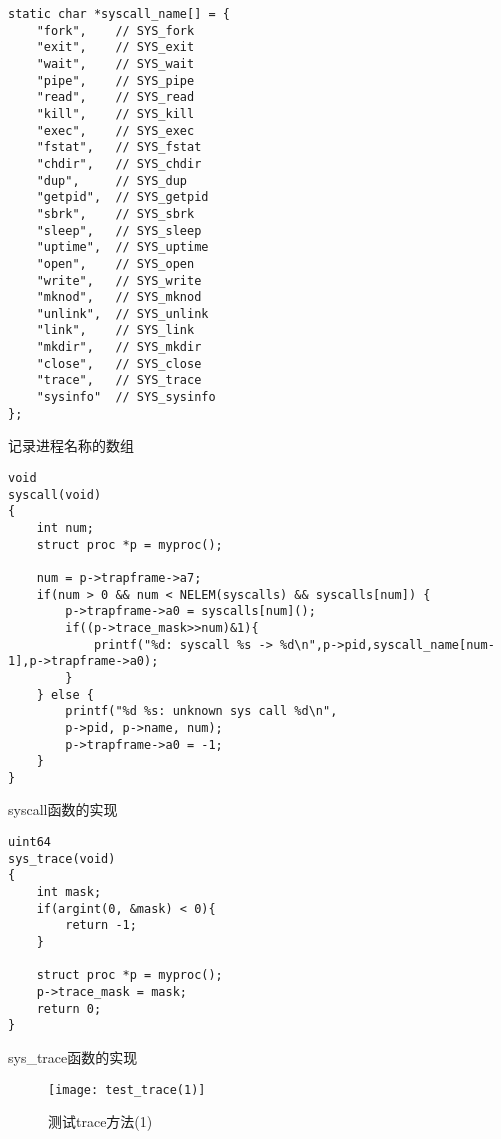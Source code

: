 \begin{listing}[!htb]
	\begin{verbatim}
static char *syscall_name[] = {
    "fork",    // SYS_fork
    "exit",    // SYS_exit
    "wait",    // SYS_wait
    "pipe",    // SYS_pipe
    "read",    // SYS_read
    "kill",    // SYS_kill
    "exec",    // SYS_exec
    "fstat",   // SYS_fstat
    "chdir",   // SYS_chdir
    "dup",     // SYS_dup
    "getpid",  // SYS_getpid
    "sbrk",    // SYS_sbrk
    "sleep",   // SYS_sleep
    "uptime",  // SYS_uptime
    "open",    // SYS_open
    "write",   // SYS_write
    "mknod",   // SYS_mknod
    "unlink",  // SYS_unlink
    "link",    // SYS_link
    "mkdir",   // SYS_mkdir
    "close",   // SYS_close
    "trace",   // SYS_trace
    "sysinfo"  // SYS_sysinfo
};
	\end{verbatim}
	\caption{记录进程名称的数组}\label{lst:syscall_name}
\end{listing}

\begin{listing}[!htb]
	\begin{verbatim}
void
syscall(void)
{
    int num;
    struct proc *p = myproc();
    
    num = p->trapframe->a7;
    if(num > 0 && num < NELEM(syscalls) && syscalls[num]) {
        p->trapframe->a0 = syscalls[num]();
        if((p->trace_mask>>num)&1){
            printf("%d: syscall %s -> %d\n",p->pid,syscall_name[num-1],p->trapframe->a0);
        }
    } else {
        printf("%d %s: unknown sys call %d\n",
        p->pid, p->name, num);
        p->trapframe->a0 = -1;
    }
}
	\end{verbatim}
	\caption{syscall函数的实现}\label{lst:syscall}
\end{listing}

\begin{listing}[!htb]
	\begin{verbatim}
uint64
sys_trace(void)
{
    int mask;
    if(argint(0, &mask) < 0){
        return -1;
    }

    struct proc *p = myproc();
    p->trace_mask = mask;
    return 0;
}
	\end{verbatim}
	\caption{sys\_trace函数的实现}\label{lst:sys_trace}
\end{listing}

\begin{figure}[!htb]
	\centering
	\texttt{[image: test\_trace(1)]}
	\caption{测试trace方法(1)}
	\label{fig:test_trace(1)}
\end{figure}

